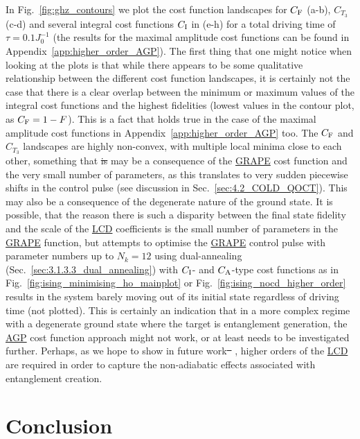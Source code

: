 \documentclass[a4paper,oneside,11pt]{book}
\newcommand{\acrref}[1]{\hyperref[acr:#1]{#1}}
\providecommand{\DIFdeltex}[1]{{\protect\color{red}\sout{#1}}}                      %
\providecommand{\DIFdelbegin}{} %
\providecommand{\DIFdelend}{} %
\providecommand{\DIFdel}[1]{\texorpdfstring{\DIFdeltex{#1}}{}} %
\newcommand{\DIFscaledelfig}{0.5}
\newlength{\DIFdelgraphicswidth} %
\newlength{\DIFdelgraphicsheight} %
\newcommand{\DIFdelincludegraphics}[2][]{%
\sbox{\DIFdelgraphicsbox}{\DIFOincludegraphics[#1]{#2}}%
\settoboxwidth{\DIFdelgraphicswidth}{\DIFdelgraphicsbox} %
\settoboxtotalheight{\DIFdelgraphicsheight}{\DIFdelgraphicsbox} %
\scalebox{\DIFscaledelfig}{%
\parbox[b]{\DIFdelgraphicswidth}{\usebox{\DIFdelgraphicsbox}\\[-\baselineskip] \rule{\DIFdelgraphicswidth}{0em}}\llap{\resizebox{\DIFdelgraphicswidth}{\DIFdelgraphicsheight}{%
\setlength{\unitlength}{\DIFdelgraphicswidth}%
\begin{picture}(1,1)%
\thicklines\linethickness{2pt} %
{\color[rgb]{1,0,0}\put(0,0){\framebox(1,1){}}}%
{\color[rgb]{1,0,0}\put(0,0){\line( 1,1){1}}}%
{\color[rgb]{1,0,0}\put(0,1){\line(1,-1){1}}}%
\end{picture}%
}\hspace*{3pt}}} %
} %
\DeclareRobustCommand{\DIFdelbegin}{\DIFOdelbegin \let\includegraphics\DIFdelincludegraphics} %
\DeclareRobustCommand{\DIFdelend}{\DIFOaddend \let\includegraphics\DIFOincludegraphics} %
\begin{document}
In Fig.~\ref{fig:ghz_contours} we plot the cost function landscapes for $C_{\rm F}$ (a-b), $C_{T_3}$ (c-d) and several integral cost functions $C_{\rm I}$ in (e-h) for a total driving time of $\tau = 0.1J_0^{-1}$ (the results for the maximal amplitude cost functions can be found in Appendix~\ref{app:higher_order_AGP}). The first thing that one might notice when looking at the plots is that while there appears to be some qualitative relationship between the different cost function landscapes, it is certainly not the case that there is a clear overlap between the minimum or maximum values of the integral cost functions and the highest fidelities (lowest values in the contour plot, as $C_{\rm F} = 1 - F$). This is a fact that holds true in the case of the maximal amplitude cost functions in Appendix~\ref{app:higher_order_AGP} too. The $C_{\rm F}$ and $C_{T_3}$ landscapes are highly non-convex, with multiple local minima close to each other, something that \DIFdelbegin \DIFdel{is }\DIFdelend may be a consequence of the \acrref{GRAPE} cost function and the very small number of parameters, as this translates to very sudden piecewise shifts in the control pulse (see discussion in Sec.~\ref{sec:4.2_COLD_QOCT}). This may also be a consequence of the degenerate nature of the ground state. It is possible, that the reason there is such a disparity between the final state fidelity and the scale of the \acrref{LCD} coefficients is the small number of parameters in the \acrref{GRAPE} function, but attempts to optimise the \acrref{GRAPE} control pulse with parameter numbers up to $N_k = 12$ using dual-annealing (Sec.~\ref{sec:3.1.3.3_dual_annealing}) with $C_{\rm I}$- and $C_{\rm A}$-type cost functions as in Fig.~\ref{fig:ising_minimising_ho_mainplot} or Fig.~\ref{fig:ising_nocd_higher_order} results in the system barely moving out of its initial state regardless of driving time (not plotted). This is certainly an indication that in a more complex regime with a degenerate ground state where the target is entanglement generation, the \acrref{AGP} cost function approach might not work, or at least needs to be investigated further. Perhaps, as we hope to show in future work\DIFdelbegin \DIFdel{\mbox{%
\cite{lawrence_numerical_2023}}\hskip0pt%
}\DIFdelend , higher orders of the \acrref{LCD} are required in order to capture the non-adiabatic effects associated with entanglement creation.


\part{Conclusion}\label{part:conclusion}
\end{document}
